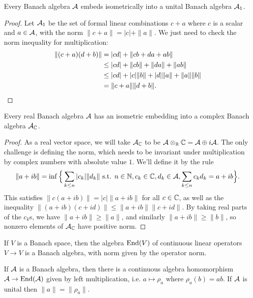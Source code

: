 \begin{prop} Every Banach algebra $\mathcal{A}$ embeds isometrically into a unital Banach algebra $\mathcal{A}_1$.
\end{prop}
\begin{proof} Let $\mathcal{A}_1$ be the set of formal linear combinations $c + a$ where $c$ is a scalar and $a \in \mathcal{A}$, with the norm $\|c+a\| = |c| + \|a\|$. We just need to check the norm inequality for multiplication:
\begin{align*}
\|(c+a)(d+b)\| &= |cd| + \|cb + da + ab\|\\
&\le |cd| + \|cb\| + \|da\| + \|ab\|\\
&\le |cd| + |c|\|b\| + |d|\|a\| + \|a\|\|b\|\\
&= \|c+a\|\|d+b\|.\qedhere
\end{align*}
\end{proof}

\begin{prop} Every real Banach algebra $\mathcal{A}$ has an isometric embedding into a complex Banach algebra $\mathcal{A}_{\mathbb{C}}$.
\end{prop}
\begin{proof} As a real vector space, we will take $\mathcal{A}_{\mathbb{C}}$ to be $\mathcal{A}\otimes_{\mathbb{R}} \mathbb{C} = \mathcal{A} \oplus i\mathcal{A}$. The only challenge is defining the norm, which needs to be invariant under multiplication by complex numbers with absolute value $1$. We'll define it by the rule
\[
\|a+ib\| = \inf \Big\{\sum_{k \le n} |c_k|\|d_k\| \text{ s.t. } n \in \mathbb{N}, c_k \in \mathbb{C}, d_k \in \mathcal{A}, \sum_{k \le n} c_kd_k = a+ib\Big\}.
\]
This satisfies $\|c(a+ib)\| = |c|\|a+ib\|$ for all $c \in \mathbb{C}$, as well as the inequality $\|(a+ib)(c+id)\| \le \|a+ib\|\|c+id\|$. By taking real parts of the $c_k$s, we have $\|a + ib\| \ge \|a\|$, and similarly $\|a+ib\| \ge \|b\|$, so nonzero elements of $\mathcal{A}_{\mathbb{C}}$ have positive norm.
\end{proof}

\begin{prop} If $V$ is a Banach space, then the algebra $\operatorname{End}(V)$ of continuous linear operators $V \rightarrow V$ is a Banach algebra, with norm given by the operator norm.
\end{prop}

\begin{prop} If $\mathcal{A}$ is a Banach algebra, then there is a continuous algebra homomorphism $\mathcal{A} \rightarrow \operatorname{End}(\mathcal{A})$ given by left multiplication, i.e. $a \mapsto \rho_a$ where $\rho_a(b) = ab$. If $\mathcal{A}$ is unital then $\|a\| = \|\rho_a\|$.
\end{prop}

